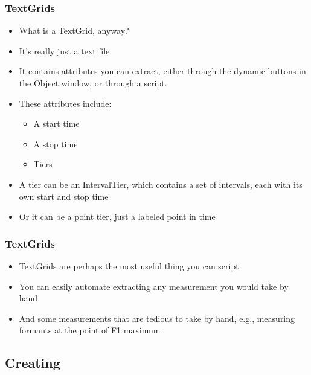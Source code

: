 \documentclass[handout]{beamer}
\begin{document}
\begin{frame}[fragile]
\frametitle{TextGrids}

\begin{itemize}
    \item <1-> What is a TextGrid, anyway?
    \item <1-> It's really just a text file.
    \item <1-> It contains attributes you can extract, either through the dynamic buttons in the Object window, or through a script.

    \item <2-> These attributes include:
    \begin{itemize}
        \item A start time
        \item A stop time
        \item Tiers
    \end{itemize}

    \item <3-> A tier can be an IntervalTier, which contains a set of intervals, each with its own start and stop time

    \item <3-> Or it can be a point tier, just a labeled point in time
\end{itemize}
\end{frame}

\begin{frame}[fragile]
\frametitle{TextGrids}

\begin{itemize}
    \item <1-> TextGrids are perhaps the most useful thing you can script
    \item <1-> You can easily automate extracting any measurement you would take by hand
    \item <2-> And some measurements that are tedious to take by hand, e.g., measuring formants at the point of F1 maximum

\end{itemize}
\end{frame}

\subsection{Creating}
\end{document}
